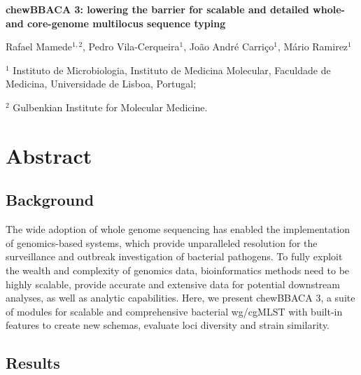 \cleardoublepage 

\begin{center}
\large
\textbf{chewBBACA 3: lowering the barrier for scalable and detailed whole- and core-genome multilocus sequence typing}
\end{center}

Rafael Mamede$^{1,2}$, 
Pedro Vila-Cerqueira$^{1}$,
João André Carriço$^{1}$,
Mário Ramirez$^{1}$

$^1$ Instituto de Microbiologia, Instituto de Medicina Molecular, Faculdade de Medicina, Universidade de Lisboa, Portugal;

$^2$ Gulbenkian Institute for Molecular Medicine.

\section{Abstract} \label{sec:ch2_abstract}

\subsection{Background} \label{ssec:ch2_abstract_background}

The wide adoption of whole genome sequencing has enabled the implementation of genomics-based systems, which provide unparalleled resolution for the surveillance and outbreak investigation of bacterial pathogens. To fully exploit the wealth and complexity of genomics data, bioinformatics methods need to be highly scalable, provide accurate and extensive data for potential downstream analyses, as well as analytic capabilities. Here, we present chewBBACA 3, a suite of modules for scalable and comprehensive bacterial \ac{wg/cgMLST} with built-in features to create new schemas, evaluate loci diversity and strain similarity.

\subsection{Results} \label{ssec:ch2_abstract_results}

